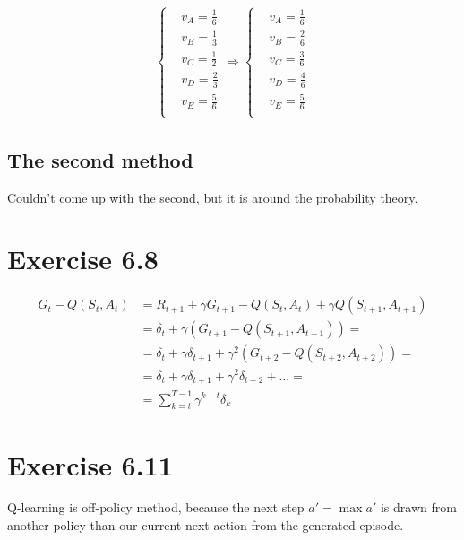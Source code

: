 \documentclass[12pt]{article}
\begin{document}
        \begin{align*}
        \begin{cases}
            &v_A = \frac{1}{6}\\
            &v_B = \frac{1}{3}\\
            &v_C = \frac{1}{2}\\
            &v_D = \frac{2}{3}\\
            &v_E = \frac{5}{6}\\
        \end{cases}
        \Rightarrow
        \begin{cases}
            &v_A = \frac{1}{6}\\
            &v_B = \frac{2}{6}\\
            &v_C = \frac{3}{6}\\
            &v_D = \frac{4}{6}\\
            &v_E = \frac{5}{6}\\
        \end{cases}
        \end{align*}

        \subsection*{The second method}
        Couldn't come up with the second, but it is around the probability theory.

    \section{Exercise 6.8}
        \begin{align*}
            G_t - Q(S_t, A_t) &= R_{t+1} + \gamma G_{t+1} - Q(S_t, A_t)
            \pm \gamma Q(S_{t+1}, A_{t+1}) \\
            & =\delta_t + \gamma (G_{t+1} - Q(S_{t+1}, A_{t+1})) =\\
            & =\delta_t + \gamma \delta_{t+1} + \gamma^2 (G_{t+2} - Q(S_{t+2}, A_{t+2})) =\\
            & =\delta_t + \gamma \delta_{t+1} + \gamma^2 \delta_{t+2} + ...=\\
            & =\sum\limits_{k=t}^{T-1}\gamma^{k-t}\delta_k
        \end{align*}

    \section{Exercise 6.11}
        Q-learning is off-policy method, because the next step $a' = \max a'$ is
        drawn from another policy than our current next action from the
        generated episode.
\end{document}
